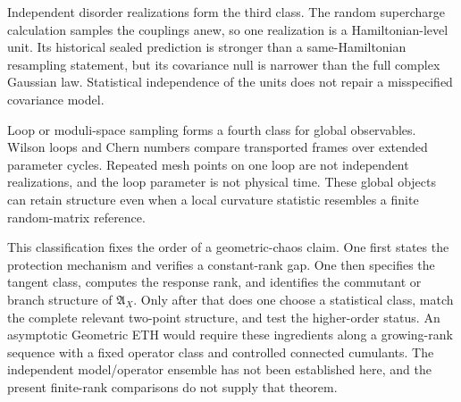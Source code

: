 Independent disorder realizations form the third class.  The random
supercharge calculation samples the couplings anew, so one realization is a
Hamiltonian-level unit.  Its historical sealed prediction is stronger than a
same-Hamiltonian resampling statement, but its covariance null is narrower
than the full complex Gaussian law.  Statistical independence of the units
does not repair a misspecified covariance model.

Loop or moduli-space sampling forms a fourth class for global observables.
Wilson loops and Chern numbers compare transported frames over extended
parameter cycles.  Repeated mesh points on one loop are not independent
realizations, and the loop parameter is not physical time.  These global
objects can retain structure even when a local curvature statistic resembles
a finite random-matrix reference.

This classification fixes the order of a geometric-chaos claim.  One first
states the protection mechanism and verifies a constant-rank gap.  One then
specifies the tangent class, computes the response rank, and identifies the
commutant or branch structure of $\mathfrak A_X$.  Only after that does one
choose a statistical class, match the complete relevant two-point structure,
and test the higher-order status.  An asymptotic Geometric ETH would require
these ingredients along a growing-rank sequence with a fixed operator class
and controlled connected cumulants.  The independent model/operator ensemble
has not been established here, and the present finite-rank comparisons do not
supply that theorem.
